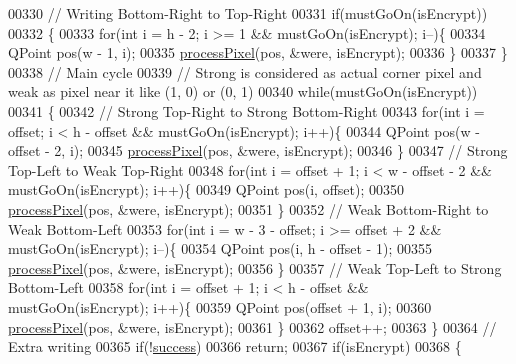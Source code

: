 \begin{DoxyCode}
00330     \textcolor{comment}{// Writing Bottom-Right to Top-Right}
00331     \textcolor{keywordflow}{if}(mustGoOn(isEncrypt))
00332     \{
00333         \textcolor{keywordflow}{for}(\textcolor{keywordtype}{int} i = h - 2; i >= 1 && mustGoOn(isEncrypt); i--)\{
00334             QPoint pos(w - 1, i);
00335             \mbox{\hyperlink{class_model_p_c_a1171f9fe1550133dc9053a46b4e5bcfd}{processPixel}}(pos, &were, isEncrypt);
00336         \}
00337     \}
00338     \textcolor{comment}{// Main cycle}
00339     \textcolor{comment}{// Strong is considered as actual corner pixel and weak as pixel near it like (1, 0) or (0, 1)}
00340     \textcolor{keywordflow}{while}(mustGoOn(isEncrypt))
00341     \{
00342         \textcolor{comment}{// Strong Top-Right to Strong Bottom-Right}
00343         \textcolor{keywordflow}{for}(\textcolor{keywordtype}{int} i = offset; i < h - offset && mustGoOn(isEncrypt); i++)\{
00344             QPoint pos(w - offset - 2, i);
00345             \mbox{\hyperlink{class_model_p_c_a1171f9fe1550133dc9053a46b4e5bcfd}{processPixel}}(pos, &were, isEncrypt);
00346         \}
00347         \textcolor{comment}{// Strong Top-Left to Weak Top-Right}
00348         \textcolor{keywordflow}{for}(\textcolor{keywordtype}{int} i = offset + 1; i < w - offset - 2 && mustGoOn(isEncrypt); i++)\{
00349             QPoint pos(i, offset);
00350             \mbox{\hyperlink{class_model_p_c_a1171f9fe1550133dc9053a46b4e5bcfd}{processPixel}}(pos, &were, isEncrypt);
00351         \}
00352         \textcolor{comment}{// Weak Bottom-Right to Weak Bottom-Left}
00353         \textcolor{keywordflow}{for}(\textcolor{keywordtype}{int} i = w - 3 - offset; i >= offset + 2 && mustGoOn(isEncrypt); i--)\{
00354             QPoint pos(i, h - offset - 1);
00355             \mbox{\hyperlink{class_model_p_c_a1171f9fe1550133dc9053a46b4e5bcfd}{processPixel}}(pos, &were, isEncrypt);
00356         \}
00357         \textcolor{comment}{// Weak Top-Left to Strong Bottom-Left}
00358         \textcolor{keywordflow}{for}(\textcolor{keywordtype}{int} i = offset + 1; i < h - offset && mustGoOn(isEncrypt); i++)\{
00359             QPoint pos(offset + 1, i);
00360             \mbox{\hyperlink{class_model_p_c_a1171f9fe1550133dc9053a46b4e5bcfd}{processPixel}}(pos, &were, isEncrypt);
00361         \}
00362         offset++;
00363     \}
00364     \textcolor{comment}{// Extra writing}
00365     \textcolor{keywordflow}{if}(!\mbox{\hyperlink{class_model_p_c_a945ffbbc44a832b953c191debd448f4c}{success}})
00366         \textcolor{keywordflow}{return};
00367     \textcolor{keywordflow}{if}(isEncrypt)
00368     \{

\end{DoxyCode}
